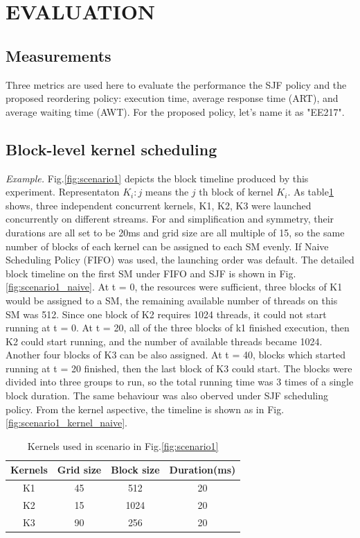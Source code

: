 \documentclass[conference]{IEEEtran}
\begin{document}
\section{EVALUATION}
\subsection{Measurements}
Three metrics are used here to evaluate the performance the SJF policy and the proposed reordering policy: execution time, average response time (ART), and average waiting time (AWT). For the proposed policy, let's name it as "EE217".

\subsection{Block-level kernel scheduling}
\textit{Example.}
Fig.\ref{fig:scenario1} depicts the block timeline produced by this experiment. Representaton $K_i:j$ means the $j$ th block of kernel $K_i$. As table\ref{table:scenario1_kernel} shows, three independent concurrent kernels, K1, K2, K3 were launched concurrently on different streams. For and simplification and symmetry, their durations are all set to be 20ms and grid size are all multiple of 15, so the same number of blocks of each kernel can be assigned to each SM evenly. If Naive Scheduling Policy (FIFO) was used, the launching order was default. The detailed block timeline on the first SM under FIFO and SJF is shown in Fig.\ref{fig:scenario1_naive}. At t = 0, the resources were sufficient, three blocks of K1 would be assigned to a SM, the remaining available number of threads on this SM was 512. Since one block of K2 requires 1024 threads, it could not start running at t = 0. At t = 20, all of the three blocks of k1 finished execution, then K2 could start running, and the number of available threads became 1024. Another four blocks of K3 can be also assigned. At t = 40, blocks which started running at t = 20 finished, then the last block of K3 could start. The blocks were divided into three groups to run, so the total running time was 3 times of a single block duration. The same behaviour was also oberved under SJF scheduling policy. From the kernel aspective, the timeline is shown as in Fig.\ref{fig:scenario1_kernel_naive}.

\begin{table}[h]
   \caption{Kernels used in scenario in Fig.\ref{fig:scenario1}}
   \centering
   \begin{tabular}{|c|c|c|c|}
   \hline
   \bf Kernels & \bf Grid size & \bf Block size & \bf Duration(ms)\\
   \hline
   K1 & 45 & 512 & 20 \\
   K2 & 15 & 1024 & 20\\ 
   K3 & 90 & 256 & 20 \\
   \hline
   \end{tabular}
   \label{table:scenario1_kernel}
\end{table}
\end{document}
